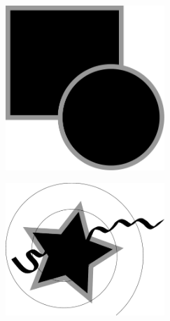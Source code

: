 \documentclass[a4paper,12pt]{article}
\begin{document}
\begin{figure}[h!]
  \caption{}
  \label{Fig1}
  \begin{center}
    \includegraphics[width=6cm]{Fig1}
  \end{center}
\end{figure}


\newpage


\begin{figure}[h!]
  \caption{}
  \label{Fig2}
  \begin{center}
    \includegraphics[width=6cm]{Fig2}
  \end{center}
\end{figure}
\end{document}
